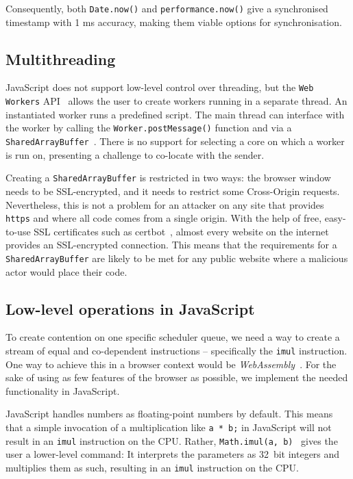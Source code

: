 \documentclass[11pt,
  titlepage=false,
  parskip=half,      %
]{scrreprt}
\begin{document}
Consequently, both \texttt{Date.now()} and \texttt{performance.now()} give a synchronised timestamp with 1 ms accuracy, making them viable options for synchronisation.

\subsection{Multithreading}\label{subsec:multithreading}
JavaScript does not support low-level control over threading, but the \texttt{Web Workers} API~\cite{webworkers} allows the user to create workers running in a separate thread.
An instantiated worker runs a predefined script.
The main thread can interface with the worker by calling the \texttt{Worker.postMessage()} function and via a \texttt{SharedArrayBuffer}~\cite{sharedarraybuffer}.
There is no support for selecting a core on which a worker is run on, presenting a challenge to co-locate with the sender.

Creating a \texttt{SharedArrayBuffer} is restricted in two ways: the browser window needs to be SSL-encrypted, and it needs to restrict some Cross-Origin requests.
Nevertheless, this is not a problem for an attacker on any site that provides \texttt{https} and where all code comes from a single origin.
With the help of free, easy-to-use SSL certificates such as certbot~\cite{certbot}, almost every website on the internet provides an SSL-encrypted connection.
This means that the requirements for a \texttt{SharedArrayBuffer} are likely to be met for any public website where a malicious actor would place their code.

\subsection{Low-level operations in JavaScript}\label{subsec:lowleveljs}
To create contention on one specific scheduler queue, we need a way to create a stream of equal and co-dependent instructions -- specifically the \texttt{imul} instruction.
One way to achieve this in a browser context would be \textit{WebAssembly}~\cite{webassembly}.
For the sake of using as few features of the browser as possible, we implement the needed functionality in JavaScript.

JavaScript handles numbers as floating-point numbers by default.
This means that a simple invocation of a multiplication like \texttt{a * b;} in JavaScript will not result in an \texttt{imul} instruction on the CPU.
Rather, \texttt{Math.imul(a, b)}~\cite{mathimul} gives the user a lower-level command:
It interprets the parameters as 32~bit integers and multiplies them as such, resulting in an \texttt{imul} instruction on the CPU.
\end{document}
